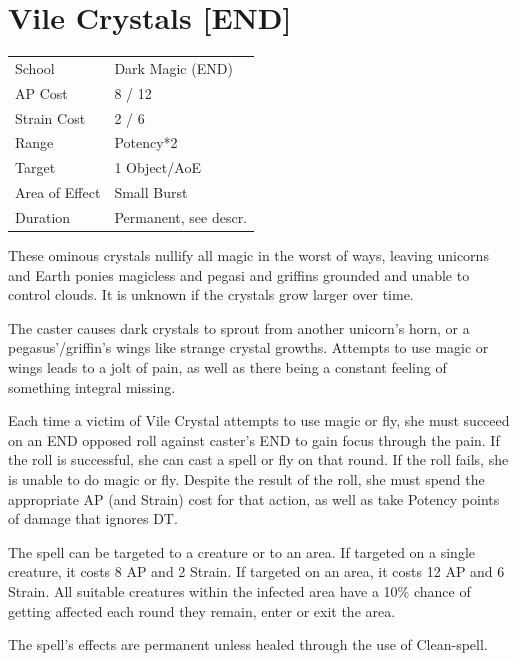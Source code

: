 \documentclass[11pt,a4paper,twocolumn]{book}
\begin{document}
\section*{Vile Crystals [END]}
{
	\begin{tabu} to 75mm{| X[l,4] | X[l,7] |}
		\hline
		School 			& Dark Magic (END) 				\\
        AP Cost	      	& 8 / 12 						\\
        Strain Cost     & 2 / 6							\\
        Range     		& Potency*2 					\\
        Target      	& 1 Object/AoE					\\
        Area of Effect  & Small Burst 	 				\\
        Duration     	& Permanent, see descr.			\\ \hline
	\end{tabu}
		
}

\medskip

These ominous crystals nullify all magic in the worst of ways, leaving unicorns and Earth ponies magicless and pegasi and griffins grounded and unable to control clouds. It is unknown if the crystals grow larger over time.

The caster causes dark crystals to sprout from another unicorn's horn, or a pegasus'/griffin's wings like strange crystal growths. Attempts to use magic or wings leads to a jolt of pain, as well as there being a constant feeling of something integral missing.

Each time a victim of Vile Crystal attempts to use magic or fly, she must succeed on an END opposed roll against caster's END to gain focus through the pain. If the roll is successful, she can cast a spell or fly on that round. If the roll fails, she is unable to do magic or fly. Despite the result of the roll, she must spend the appropriate AP (and Strain) cost for that action, as well as take Potency points of damage that ignores DT.

The spell can be targeted to a creature or to an area. If targeted on a single creature, it costs 8 AP and 2 Strain. If targeted on an area, it costs 12 AP and 6 Strain. All suitable creatures within the infected area have a 10\% chance of getting affected each round they remain, enter or exit the area.

The spell's effects are permanent unless healed through the use of Clean-spell.
\end{document}
